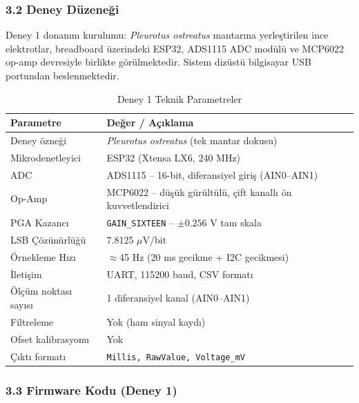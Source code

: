 \documentclass[11pt,a4paper]{article}
\begin{document}
\subsubsection*{3.2 Deney Düzeneği}

Deney 1 donanım kurulumu: \textit{Pleurotus ostreatus} mantarına yerleştirilen ince elektrotlar, breadboard üzerindeki ESP32, ADS1115 ADC modülü ve MCP6022 op-amp devresiyle birlikte görülmektedir. Sistem dizüstü bilgisayar USB portundan beslenmektedir.

\begin{table}[h]
\centering
\caption{Deney 1 Teknik Parametreler}
\begin{tabular}{p{4.5cm}p{8.2cm}}
\toprule
\textbf{Parametre} & \textbf{Değer / Açıklama}\\
\midrule
Deney özneği & \textit{Pleurotus ostreatus} (tek mantar dokusu)\\
Mikrodenetleyici & ESP32 (Xtensa LX6, 240 MHz)\\
ADC & ADS1115 -- 16-bit, diferansiyel giriş (AIN0--AIN1)\\
Op-Amp & MCP6022 -- düşük gürültülü, çift kanallı ön kuvvetlendirici\\
PGA Kazancı & \texttt{GAIN\_SIXTEEN} -- $\pm 0.256$ V tam skala\\
LSB Çözünürlüğü & 7.8125 $\mu$V/bit\\
Örnekleme Hızı & $\approx$45 Hz (20 ms gecikme + I2C gecikmesi)\\
İletişim & UART, 115200 baud, CSV formatı\\
Ölçüm noktası sayısı & 1 diferansiyel kanal (AIN0--AIN1)\\
Filtreleme & Yok (ham sinyal kaydı)\\
Ofset kalibrasyonu & Yok\\
Çıktı formatı & \texttt{Millis, RawValue, Voltage\_mV}\\
\bottomrule
\end{tabular}
\end{table}

\subsubsection*{3.3 Firmware Kodu (Deney 1)}
\end{document}
